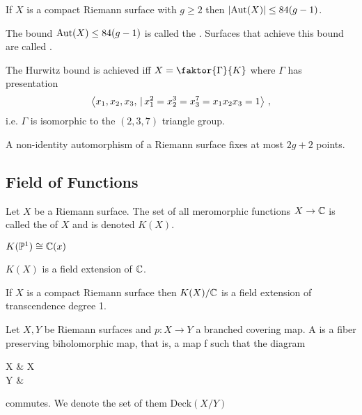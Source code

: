 \documentclass{article}
\begin{document}
\begin{theorem}
	If $X$ is a compact Riemann surface with $g\geq 2$ then $\left\lvert \operatorname{Aut}(X) \right\rvert \leq 84(g-1)$. 
\end{theorem}

\begin{definition}
	The bound $\operatorname{Aut}(X) \leq 84(g-1)$ is called the . Surfaces that achieve this bound are called .
\end{definition}

\begin{theorem}
	The Hurwitz bound is achieved iff $X = \faktor{\Gamma}{K}$ where $\Gamma$ has presentation 
	\[
	\left\langle x_1, x_2, x_3, \, | \, x_1^2 = x_2^3 = x_3^7 = x_1x_2x_3 = 1 \right\rangle \, , 
	\]
	i.e. $\Gamma$ is isomorphic to the $(2,3,7)$ triangle group. 
\end{theorem}

\begin{theorem}
	A non-identity automorphism of a Riemann surface fixes at most $2g+2$ points. 
\end{theorem}
\subsection{Field of Functions}

\begin{definition}
	Let $X$ be a Riemann surface. The set of all meromorphic functions $X \to \mathbb{C}$ is called the  of $X$ and is denoted $K(X)$. 
\end{definition}

\begin{example}
	$K(\mathbb{P}^1) \cong \mathbb{C}(x)$
\end{example}

\begin{prop}
	$K(X)$ is a field extension of $\mathbb{C}$. 
\end{prop}

\begin{prop}
	If $X$ is a compact Riemann surface then $K(X)/\mathbb{C}$ is a field extension of transcendence degree 1.  
\end{prop}

\begin{definition}
	Let $X, Y$ be Riemann surfaces and $p : X \to Y$ a branched covering map. A  is a fiber preserving biholomorphic map, that is, a map f such that the diagram
	\begin{tkz}
		X \arrow[r,"f"] \arrow[d,"p"'] & X \arrow[dl,"p"]\\
		Y &
	\end{tkz}
	commutes. We denote the set of them  $\text{Deck}(X/Y)$
\end{definition}
\end{document}
